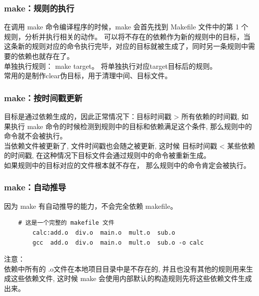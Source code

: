 \documentclass[UTF8]{ctexart}
\begin{document}
\subsubsection{make：规则的执行}
在调用 make 命令编译程序的时候，make 会首先找到 Makefile 文件中的第 1 个规则，分析并执行相关的动作。
可以将不存在的依赖作为新的规则中的目标，当这条新的规则对应的命令执行完毕，对应的目标就被生成了，同时另一条规则中需要的依赖也就存在了。
\\
\indent 单独执行规则：
make target。
将单独执行对应target目标后的规则。
\\
\indent 常用的是制作clear伪目标，用于清理中间、目标文件。

\subsubsection{make：按时间戳更新}
目标是通过依赖生成的，因此正常情况下：目标时间戳 > 所有依赖的时间戳, 如果执行 make 命令的时候检测到规则中的目标和依赖满足这个条件, 那么规则中的命令就不会被执行。
\\
\indent 当依赖文件被更新了, 文件时间戳也会随之被更新, 这时候 目标时间戳 < 某些依赖的时间戳, 在这种情况下目标文件会通过规则中的命令被重新生成。
\\
\indent	如果规则中的目标对应的文件根本就不存在， 那么规则中的命令肯定会被执行。

\subsubsection{make：自动推导}
因为 make 有自动推导的能力，不会完全依赖 makefile。
\begin{verbatim}
	# 这是一个完整的 makefile 文件
		calc:add.o  div.o  main.o  mult.o  sub.o
        gcc  add.o  div.o  main.o  mult.o  sub.o -o calc
\end{verbatim}
注意：\\
\indent 依赖中所有的 .o文件在本地项目目录中是不存在的, 并且也没有其他的规则用来生成这些依赖文件, 这时候 make 会使用内部默认的构造规则先将这些依赖文件生成出来。
\end{document}
